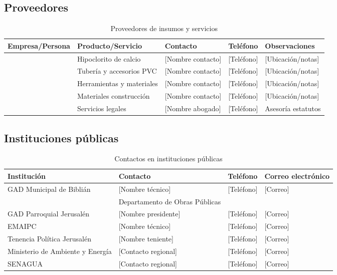 \subsection*{Proveedores}

\begin{table}[H]
\centering
\caption{Proveedores de insumos y servicios}
\label{tab:contactos-proveedores}
\begin{tabularx}{\textwidth}{@{}llllX@{}}
\toprule
\textbf{Empresa/Persona} & \textbf{Producto/Servicio} & \textbf{Contacto} & \textbf{Teléfono} & \textbf{Observaciones} \\
\midrule
[Nombre proveedor] & Hipoclorito de calcio & [Nombre contacto] & [Teléfono] & [Ubicación/notas] \\
[Nombre proveedor] & Tubería y accesorios PVC & [Nombre contacto] & [Teléfono] & [Ubicación/notas] \\
[Nombre proveedor] & Herramientas y materiales & [Nombre contacto] & [Teléfono] & [Ubicación/notas] \\
[Nombre proveedor] & Materiales construcción & [Nombre contacto] & [Teléfono] & [Ubicación/notas] \\
[Nombre] & Servicios legales & [Nombre abogado] & [Teléfono] & Asesoría estatutos \\
\bottomrule
\end{tabularx}
\end{table}

\subsection*{Instituciones públicas}

\begin{table}[H]
\centering
\caption{Contactos en instituciones públicas}
\label{tab:contactos-instituciones}
\begin{tabularx}{\textwidth}{@{}lllX@{}}
\toprule
\textbf{Institución} & \textbf{Contacto} & \textbf{Teléfono} & \textbf{Correo electrónico} \\
\midrule
GAD Municipal de Biblián & [Nombre técnico] & [Teléfono] & [Correo] \\
 & Departamento de Obras Públicas & & \\
GAD Parroquial Jerusalén & [Nombre presidente] & [Teléfono] & [Correo] \\
EMAIPC & [Nombre técnico] & [Teléfono] & [Correo] \\
Tenencia Política Jerusalén & [Nombre teniente] & [Teléfono] & [Correo] \\
Ministerio de Ambiente y Energía & [Contacto regional] & [Teléfono] & [Correo] \\
SENAGUA & [Contacto regional] & [Teléfono] & [Correo] \\
\bottomrule
\end{tabularx}
\end{table}

